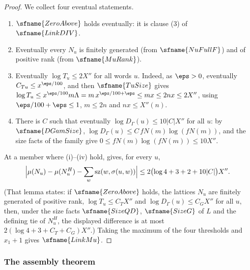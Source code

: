 \begin{proof}
We collect four eventual statements.
\begin{enumerate}[label=(\roman*)]
\item $\sfname{ZeroAbove}$ holds eventually: it is clause (3) of $\sfname{LinkDIV}$.
\item Eventually every $N_u$ is finitely generated (from $\sfname{NuFullF}$) and of positive rank (from
$\sfname{MuRank}$).
\item Eventually $\log T_u\le2X''$ for all words $u$. Indeed, as $\eps>0$, eventually $C_{Tu}\le x^{\eps/100}$,
and then $\sfname{TuSize}$ gives $\log T_u\le x^{\eps/100}m\Lambda=m\,x^{\eps/100+\eps}\le mx\le2nx\le2X''$,
using $\eps/100+\eps\le1$, $m\le2n$ and $nx\le X''(n)$.
\item There is $C$ such that eventually $\log D_\Gamma(u)\le10|C|X''$ for all $u$: by $\sfname{DGamSize}$,
$\log D_\Gamma(u)\le C\,fN(m)\log(fN(m))$, and the size facts of the family give
$0\le fN(m)\log(fN(m))\le10X''$.
\end{enumerate}
At a member where (i)--(iv) hold,  gives, for every $u$,
\[
\Bigl|\mu(N_u)-\mu(N^H_u)-\sum_w\mathrm{sz}(w,\sigma(u,w))\Bigr|\le2\bigl(\log4+3+2+10|C|\bigr)X'' .
\]
(That lemma states: if $\sfname{ZeroAbove}$ holds, the lattices $N_u$ are finitely generated of positive rank,
$\log T_u\le C_TX''$ and $\log D_\Gamma(u)\le C_GX''$ for all $u$, then, under the size facts $\sfname{SizeQD}$,
$\sfname{SizeG}$ of $L$ and the defining tie of $N^H_u$, the displayed difference is at most
$2(\log4+3+C_T+C_G)X''$.) Taking the maximum of the four thresholds and $x_1+1$ gives $\sfname{LinkMu}$.
\end{proof}

\subsubsection*{The assembly theorem}

